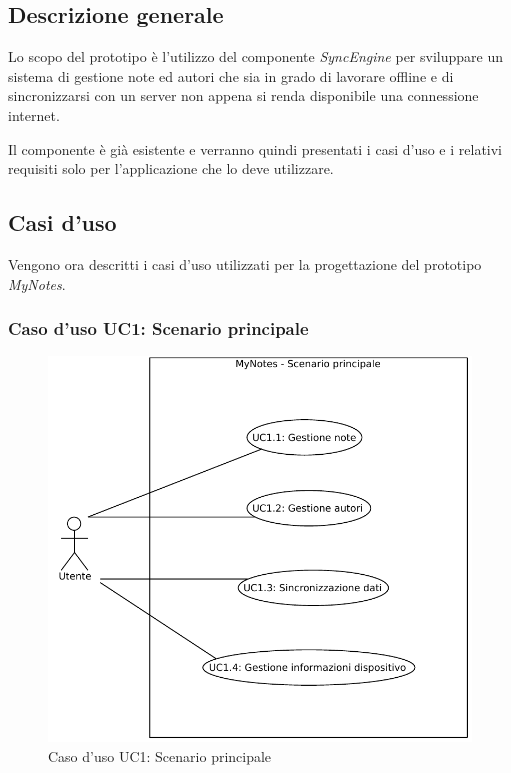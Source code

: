 \subsection{Descrizione generale}
Lo scopo del prototipo è  l'utilizzo del componente \emph{SyncEngine} per sviluppare un sistema di gestione note ed autori che sia in grado di lavorare offline e di sincronizzarsi con un server non appena si renda disponibile una connessione internet.

Il componente è già esistente e verranno quindi presentati i casi d'uso e i relativi requisiti solo per l'applicazione che lo deve utilizzare.

\subsection{Casi d'uso}
Vengono ora descritti i casi d'uso utilizzati per la progettazione del prototipo \emph{MyNotes}.

\subsubsection{Caso d'uso UC1: Scenario principale}
\begin{figure}[htb]
\centering
\includegraphics[scale=0.6]{gfx/useCase/MN_UC1_Scenario_principale.pdf}
\caption{Caso d'uso UC1: Scenario principale}
\label{fig:My notes UC1}
\end{figure}

